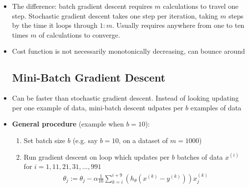 \documentclass[titlepage]{article}
\begin{document}
\begin{itemize}
	\item The difference: batch gradient descent requires $m$ calculations to travel one step. Stochastic gradient descent takes one step per iteration, taking $m$ steps by the time it loops through $1:m$. Usually requires anywhere from one to ten times $m$ of calculations to converge.
	
	\item Cost function is not necessarily monotonically decreasing, can bounce around
	
	\subsection{Mini-Batch Gradient Descent}
	\item Can be faster than stochastic gradient descent. Instead of looking updating per one example of data, mini-batch descent udpates per $b$ examples of data
	\item \textbf{General procedure} (example when $b=10$):
	\begin{enumerate}
	\item Set batch size $b$ (e.g. say $b = 10$, on a dataset of $m=1000$)
	\item Run gradient descent on loop which updates per $b$ batches of data $x^{(i)}$\\
	for $i = 1,11,21,31,...,991$
	\begin{align*}
	\theta_j := \theta_j - \alpha \frac{1}{10} \sum_{k=i}^{i+9} (h_\theta (x^{(k)} - y^{(k)}))x_j^{(k)}
	\end{align*}
	\end{enumerate}
	
	\end{itemize}
	
\end{document}
